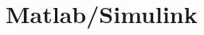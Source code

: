 \documentclass[\rootfolder/main.tex]{subfiles}
\begin{document}
\chapter{Matlab/Simulink} %

\label{Chapter03} %




\end{document}
